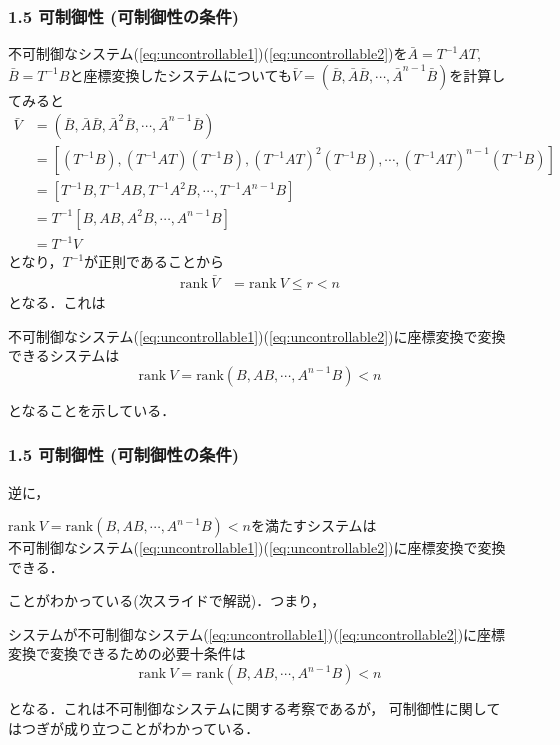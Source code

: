 \begin{frame}[t]
\frametitle{1.5 可制御性 (可制御性の条件)}
不可制御なシステム(\ref{eq:uncontrollable1})(\ref{eq:uncontrollable2})を$\bar{A}= T^{-1} A T$, $\bar{B} = T^{-1}B$と座標変換したシステムについても$\bar{V}=(\bar{B},\bar{A}\bar{B},\cdots, \bar{A}^{n-1}\bar{B})$を計算してみると
\begin{align}
 \bar{V}&=(\bar{B},\bar{A}\bar{B},\bar{A}^{2}\bar{B},\cdots, \bar{A}^{n-1}\bar{B})
\nonumber\\
 &= [(T^{-1}B), (T^{-1}AT)(T^{-1}B),(T^{-1}AT)^{2}(T^{-1}B),\cdots,(T^{-1}AT)^{n-1}(T^{-1}B)]
\nonumber \\
 &= [T^{-1}B, T^{-1} AB, T^{-1} A^2 B,\cdots, T^{-1} A^{n-1} B]
\nonumber\\
 &= T^{-1} [B, AB, A^2 B,\cdots, A^{n-1} B]
\nonumber \\
 &= T^{-1} V
\end{align}
となり，$T^{-1}$が正則であることから
\begin{align}
 \mbox{rank}\ \bar{V} & = \mbox{rank}\ {V} \leq r < n
\end{align}
となる．これは
\begin{block}{}
不可制御なシステム(\ref{eq:uncontrollable1})(\ref{eq:uncontrollable2})に座標変換で変換できるシステムは
$$\mbox{rank}\ V = \mbox{rank} (B,AB,\cdots,A^{n-1}B) < n$$
\end{block}
となることを示している．
\end{frame}


\begin{frame}[t]
\frametitle{1.5 可制御性 (可制御性の条件)}
逆に，
\begin{block}{}
$\mbox{rank}\ V = \mbox{rank} (B,AB,\cdots,A^{n-1}B) < n$を満たすシステムは\\
不可制御なシステム(\ref{eq:uncontrollable1})(\ref{eq:uncontrollable2})に座標変換で変換できる．
\end{block}
ことがわかっている(次スライドで解説)．つまり，
\begin{block}{}
システムが不可制御なシステム(\ref{eq:uncontrollable1})(\ref{eq:uncontrollable2})に座標変換で変換できるための必要十条件は
$$\mbox{rank}\ V = \mbox{rank} (B,AB,\cdots,A^{n-1}B) < n$$
\end{block}
となる．これは不可制御なシステムに関する考察であるが，
可制御性に関してはつぎが成り立つことがわかっている．
\end{frame}


